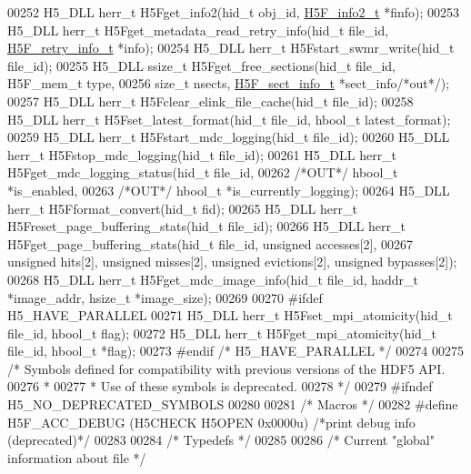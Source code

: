 \begin{DoxyCode}
00252 H5\_DLL herr\_t H5Fget\_info2(hid\_t obj\_id, \hyperlink{struct_h5_f__info2__t}{H5F\_info2\_t} *finfo);
00253 H5\_DLL herr\_t H5Fget\_metadata\_read\_retry\_info(hid\_t file\_id, \hyperlink{struct_h5_f__retry__info__t}{H5F\_retry\_info\_t} *info);
00254 H5\_DLL herr\_t H5Fstart\_swmr\_write(hid\_t file\_id);
00255 H5\_DLL ssize\_t H5Fget\_free\_sections(hid\_t file\_id, H5F\_mem\_t type,
00256     \textcolor{keywordtype}{size\_t} nsects, \hyperlink{struct_h5_f__sect__info__t}{H5F\_sect\_info\_t} *sect\_info\textcolor{comment}{/*out*/});
00257 H5\_DLL herr\_t H5Fclear\_elink\_file\_cache(hid\_t file\_id);
00258 H5\_DLL herr\_t H5Fset\_latest\_format(hid\_t file\_id, hbool\_t latest\_format);
00259 H5\_DLL herr\_t H5Fstart\_mdc\_logging(hid\_t file\_id);
00260 H5\_DLL herr\_t H5Fstop\_mdc\_logging(hid\_t file\_id);
00261 H5\_DLL herr\_t H5Fget\_mdc\_logging\_status(hid\_t file\_id,
00262                                         \textcolor{comment}{/*OUT*/} hbool\_t *is\_enabled,
00263                                         \textcolor{comment}{/*OUT*/} hbool\_t *is\_currently\_logging);
00264 H5\_DLL herr\_t H5Fformat\_convert(hid\_t fid);
00265 H5\_DLL herr\_t H5Freset\_page\_buffering\_stats(hid\_t file\_id);
00266 H5\_DLL herr\_t H5Fget\_page\_buffering\_stats(hid\_t file\_id, \textcolor{keywordtype}{unsigned} accesses[2],
00267     \textcolor{keywordtype}{unsigned} hits[2], \textcolor{keywordtype}{unsigned} misses[2], \textcolor{keywordtype}{unsigned} evictions[2], \textcolor{keywordtype}{unsigned} bypasses[2]);
00268 H5\_DLL herr\_t H5Fget\_mdc\_image\_info(hid\_t file\_id, haddr\_t *image\_addr, hsize\_t *image\_size);
00269 
00270 \textcolor{preprocessor}{#ifdef H5\_HAVE\_PARALLEL}
00271 H5\_DLL herr\_t H5Fset\_mpi\_atomicity(hid\_t file\_id, hbool\_t flag);
00272 H5\_DLL herr\_t H5Fget\_mpi\_atomicity(hid\_t file\_id, hbool\_t *flag);
00273 \textcolor{preprocessor}{#endif }\textcolor{comment}{/* H5\_HAVE\_PARALLEL */}\textcolor{preprocessor}{}
00274 
00275 \textcolor{comment}{/* Symbols defined for compatibility with previous versions of the HDF5 API.}
00276 \textcolor{comment}{ *}
00277 \textcolor{comment}{ * Use of these symbols is deprecated.}
00278 \textcolor{comment}{ */}
00279 \textcolor{preprocessor}{#ifndef H5\_NO\_DEPRECATED\_SYMBOLS}
00280 
00281 \textcolor{comment}{/* Macros */}
00282 \textcolor{preprocessor}{#define H5F\_ACC\_DEBUG   (H5CHECK H5OPEN 0x0000u)    }\textcolor{comment}{/*print debug info (deprecated)*/}\textcolor{preprocessor}{}
00283 
00284 \textcolor{comment}{/* Typedefs */}
00285 
00286 \textcolor{comment}{/* Current "global" information about file */}

\end{DoxyCode}
